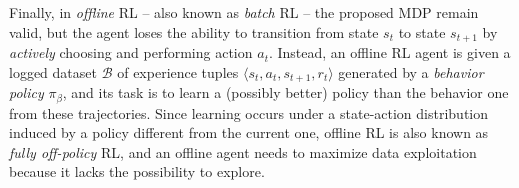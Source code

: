 Finally, in \textit{offline} RL -- also known as \textit{batch} RL --
the proposed MDP remain valid, but the agent loses the ability to transition
from state $s_t$ to state $s_{t+1}$ by \textit{actively} choosing and
performing action $a_t$. Instead, an offline RL agent is given a
logged dataset $\mathcal{B}$ of experience tuples
$\langle s_t,a_t,s_{t+1},r_t\rangle$ generated by a \textit{behavior
policy} $\pi_{\beta}$, and its task is to learn a (possibly better)
policy than the behavior one from these trajectories.
Since learning occurs under a state-action distribution induced by a
policy different from the current one, offline RL is also
known as \textit{fully off-policy} RL, and an offline agent needs to
maximize data exploitation because it lacks the possibility to
explore.